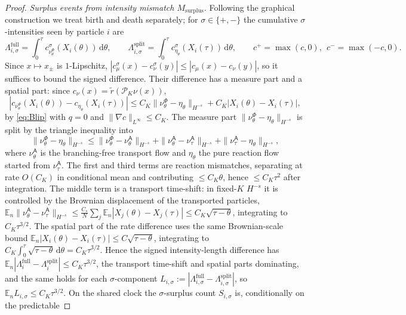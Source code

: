 \documentclass[a4paper,fleqn]{cas-sc}
\theoremstyle{definition}
\theoremstyle{remark}
\begin{document}
\begin{proof}
\emph{Surplus events from intensity mismatch $M_{\mathrm{surplus}}$.} Following the
graphical construction we treat birth and death separately; for $\sigma\in\{+,-\}$
the cumulative $\sigma$-intensities seen by particle $i$ are
\[
\Lambda^{\mathrm{full}}_{i,\sigma}=\int_0^\tau c^{\sigma}_{\nu^\Phi_\theta}(X_i(\theta))\,\mathrm d\theta,
\qquad
\Lambda^{\mathrm{split}}_{i,\sigma}=\int_0^\tau c^{\sigma}_{\eta_\theta}(X_i(\tau))\,\mathrm d\theta,
\qquad c^{+}=\max(c,0),\ \ c^{-}=\max(-c,0).
\]
Since $x\mapsto x_\pm$ is $1$-Lipschitz,
$|c^{\sigma}_{\mu}(x)-c^{\sigma}_{\nu}(y)|\le|c_{\mu}(x)-c_{\nu}(y)|$, so it suffices
to bound the signed difference.
Their difference has a measure part and a spatial part: since
$c_\nu(x)=\tilde r(\mathcal P_K\nu(x))$,
\[
|c_{\nu^\Phi_\theta}(X_i(\theta))-c_{\eta_\theta}(X_i(\tau))|
\le C_K\|\nu^\Phi_\theta-\eta_\theta\|_{H^{-s}}+C_K|X_i(\theta)-X_i(\tau)|,
\]
by \eqref{eq:Blip} with $q=0$ and $\|\nabla c\|_{L^\infty}\le C_K$. The measure
part $\|\nu^\Phi_\theta-\eta_\theta\|_{H^{-s}}$ is split by the triangle
inequality into
\[
\|\nu^\Phi_\theta-\eta_\theta\|_{H^{-s}}
\le\|\nu^\Phi_\theta-\nu^{\mathsf A}_\theta\|_{H^{-s}}
+\|\nu^{\mathsf A}_\theta-\nu^{\mathsf A}_\tau\|_{H^{-s}}
+\|\nu^{\mathsf A}_\tau-\eta_\theta\|_{H^{-s}},
\]
where $\nu^{\mathsf A}_\theta$ is the branching-free transport flow and
$\eta_\theta$ the pure reaction flow started from $\nu^{\mathsf A}_\tau$. The
first and third terms are reaction mismatches, separating at rate $O(C_K)$ in
conditional mean and contributing $\le C_K\theta$, hence $\le C_K\tau^2$ after
integration. The middle term is a transport time-shift: in fixed-$K$ $H^{-s}$ it
is controlled by the Brownian displacement of the transported particles,
$\mathbb E_n\|\nu^{\mathsf A}_\theta-\nu^{\mathsf A}_\tau\|_{H^{-s}}\le
\frac{C_s}{N}\sum_j\mathbb E_n|X_j(\theta)-X_j(\tau)|\le C_K\sqrt{\tau-\theta}$,
integrating to $C_K\tau^{3/2}$. The spatial part of the rate difference uses the
same Brownian-scale bound $\mathbb E_n|X_i(\theta)-X_i(\tau)|\le C\sqrt{\tau-\theta}$,
integrating to $C_K\int_0^\tau\sqrt{\tau-\theta}\,\mathrm d\theta=C_K\tau^{3/2}$.
Hence the signed intensity-length difference has
$\mathbb E_n|\Lambda^{\mathrm{full}}_i-\Lambda^{\mathrm{split}}_i|\le C_K\tau^{3/2}$,
the transport time-shift and spatial parts dominating, and the same holds for each
$\sigma$-component $L_{i,\sigma}:=|\Lambda^{\mathrm{full}}_{i,\sigma}-\Lambda^{\mathrm{split}}_{i,\sigma}|$,
so $\mathbb E_n L_{i,\sigma}\le C_K\tau^{3/2}$. On the shared clock the
$\sigma$-surplus count $S_{i,\sigma}$ is, conditionally on the predictable

\end{proof}
\end{document}
